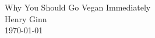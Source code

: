 \documentclass[hidelinks, 11 pt]{article}
\begin{document}
\addtolength{\topmargin}{-1.6pt}
\thispagestyle{firstpage}

\begin{center}
    \vspace*{-20mm}
    \huge Why You Should Go Vegan Immediately  \\
    \vspace{5mm}
    \large Henry Ginn  \\
    \vspace{3 mm}
    \large \today
\end{center}
\vspace{5mm}







\clearpage

\fancyhf{}
\fancyhead[R]{}
\fancyfoot[C]{\thepage}




\clearpage

\pagestyle{fancy}
\appendix

\clearpage
\end{document}
